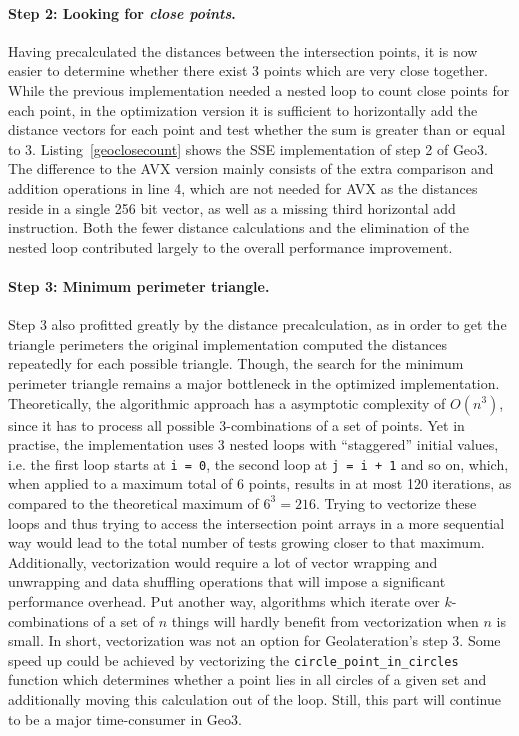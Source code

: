 
\paragraph{Step 2: Looking for \emph{close points}.} Having precalculated the distances between the intersection points, it is now easier to determine whether there exist 3 points which are very close together. While the previous implementation needed a nested loop to count close points for each point, in the optimization version it is sufficient to horizontally add the distance vectors for each point and test whether the sum is greater than or equal to 3. Listing~\ref{geoclosecount} shows the SSE implementation of step 2 of Geo3. The difference to the AVX version mainly consists of the extra comparison and addition operations in line 4, which are not needed for AVX as the distances reside in a single 256 bit vector, as well as a missing third horizontal add instruction. Both the fewer distance calculations and the elimination of the nested loop contributed largely to the overall performance improvement.


\paragraph{Step 3: Minimum perimeter triangle.} Step 3 also profitted greatly by the distance precalculation, as in order to get the triangle perimeters the original implementation computed the distances repeatedly for each possible triangle. Though, the search for the minimum perimeter triangle remains a major bottleneck in the optimized implementation. Theoretically, the algorithmic approach has a asymptotic complexity of $O(n^{3})$, since it has to process all possible 3-combinations of a set of points. Yet in practise, the implementation uses 3 nested loops with ``staggered'' initial values, i.e. the first loop starts at \texttt{i = 0}, the second loop at \texttt{j = i + 1} and so on, which, when applied to a maximum total of 6 points, results in at most 120 iterations, as compared to the theoretical maximum of $6^{3} = 216$. Trying to vectorize these loops and thus trying to access the intersection point arrays in a more sequential way would lead to the total number of tests growing closer to that maximum. Additionally, vectorization would require a lot of vector wrapping and unwrapping and data shuffling operations that will impose a significant performance overhead. Put another way, algorithms which iterate over $k$-combinations of a set of $n$ things will hardly benefit from vectorization when $n$ is small.
In short, vectorization was not an option for Geolateration's step 3. Some speed up could be achieved by vectorizing the \texttt{circle\_point\_in\_circles} function which determines whether a point lies in all circles of a given set and additionally moving this calculation out of the loop. Still, this part will continue to be a major time-consumer in Geo3. 

